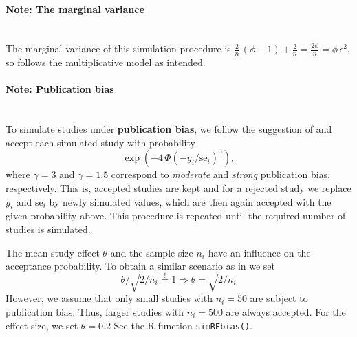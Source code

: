\documentclass[letterpaper, 12pt]{article}
\begin{document}
\paragraph{Note: The marginal variance}\mbox{}\\
The marginal variance of this simulation procedure is
$\frac{2}{n} \, (\phi-1) + \frac{2}{n} = \frac{2\phi}{n} = \phi \, \epsilon^2$, so follows the multiplicative
model as intended.


\paragraph{Note: Publication bias}\mbox{}\\
To simulate studies under \textbf{publication bias}, we follow the suggestion of \citet{henm:copa:10} and accept each simulated study with probability
$$\exp(-4\, \Phi(-y_i / \text{se}_i)^\gamma ),$$
where $\gamma = 3$ and $\gamma = 1.5$ correspond to \emph{moderate} and \emph{strong} publication bias, respectively.
This is, accepted studies are kept and for a rejected study we replace $y_i$ and $\text{se}_i$ by newly simulated values, which are then again accepted with the given probability above.
This procedure is repeated until the required number of studies is simulated. 

The mean study effect $\theta$ and the sample size $n_i$ have an influence on the acceptance probability.
To obtain a similar scenario as in \citet{henm:copa:10} we set
$$ \theta / \sqrt{2/n_i}  \overset{!}{=} 1 \Rightarrow \theta = \sqrt{2/n_i}$$
However, we assume that only small studies with $n_i = 50$ are subject to publication bias. Thus, larger studies with $n_i = 500$ are always accepted. For the effect size, we set $\theta = 0.2$
See the R function \texttt{simREbias()}.


\end{document}
